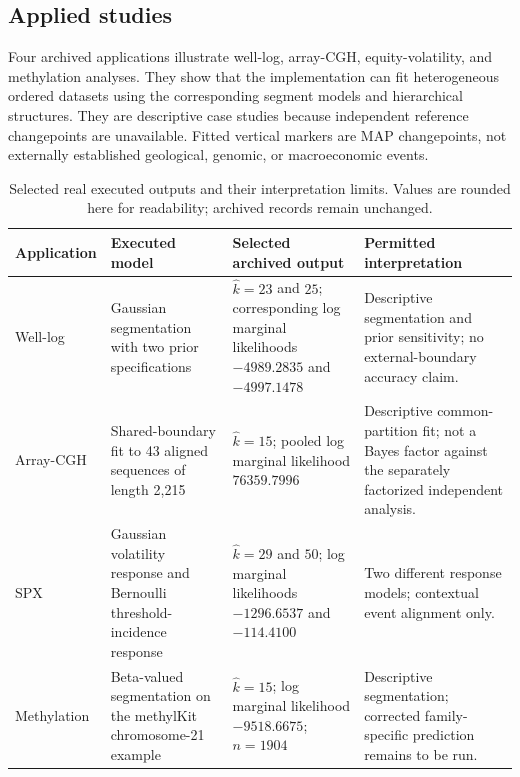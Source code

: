 \subsection{Applied studies}

Four archived applications illustrate well-log, array-CGH, equity-volatility, and methylation analyses. They show that the implementation can fit heterogeneous ordered datasets using the corresponding segment models and hierarchical structures. They are descriptive case studies because independent reference changepoints are unavailable. Fitted vertical markers are MAP changepoints, not externally established geological, genomic, or macroeconomic events.

\begin{table}[H]
\centering
\small
\begin{tabularx}{0.96\textwidth}{@{}p{}p{}p{}X@{}}
\toprule
\textbf{Application} & \textbf{Executed model} & \textbf{Selected archived output} & \textbf{Permitted interpretation} \\
\midrule
Well-log & Gaussian segmentation with two prior specifications & $\widehat{k}=23$ and $25$; corresponding log marginal likelihoods $-4989.2835$ and $-4997.1478$ & Descriptive segmentation and prior sensitivity; no external-boundary accuracy claim. \\
Array-CGH & Shared-boundary fit to 43 aligned sequences of length 2,215 & $\widehat{k}=15$; pooled log marginal likelihood $76359.7996$ & Descriptive common-partition fit; not a Bayes factor against the separately factorized independent analysis. \\
SPX & Gaussian volatility response and Bernoulli threshold-incidence response & $\widehat{k}=29$ and $50$; log marginal likelihoods $-1296.6537$ and $-114.4100$ & Two different response models; contextual event alignment only. \\
Methylation & Beta-valued segmentation on the methylKit chromosome-21 example & $\widehat{k}=15$; log marginal likelihood $-9518.6675$; $n=1904$ & Descriptive segmentation; corrected family-specific prediction remains to be run. \\
\bottomrule
\end{tabularx}
\caption{Selected real executed outputs and their interpretation limits. Values are rounded here for readability; archived records remain unchanged.}
\label{tab:exec-real-data}
\end{table}
